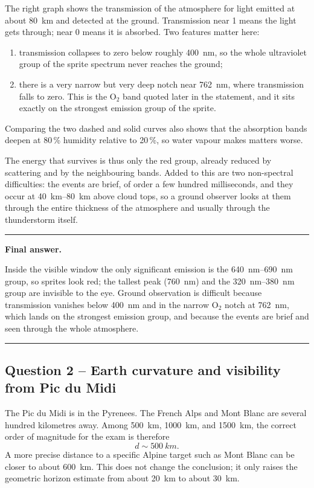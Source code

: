 \documentclass[11pt,a4paper]{article}
\newenvironment{finalanswer}{%
  \begin{center}\begin{minipage}{0.94\linewidth}\hrule\vspace{0.45em}\textbf{Final answer. }%
}{%
  \vspace{0.45em}\hrule\end{minipage}\end{center}%
}
\newcommand{\Otwo}{\ensuremath{\mathrm{O}_2}}
\begin{document}
The right graph shows the transmission of the atmosphere for light emitted at
about \SI{80}{km} and detected at the ground. Transmission near 1 means the light
gets through; near 0 means it is absorbed. Two features matter here:
\begin{enumerate}[label=\arabic*)]
\item transmission collapses to zero below roughly \SI{400}{nm}, so the whole
ultraviolet group of the sprite spectrum never reaches the ground;
\item there is a very narrow but very deep notch near \SI{762}{nm}, where
transmission falls to zero. This is the \Otwo{} band quoted later in the
statement, and it sits exactly on the strongest emission group of the sprite.
\end{enumerate}
Comparing the two dashed and solid curves also shows that the absorption bands
deepen at 80\,\% humidity relative to 20\,\%, so water vapour makes matters
worse.

The energy that survives is thus only the red group, already reduced by
scattering and by the neighbouring bands. Added to this are two non-spectral
difficulties: the events are brief, of order a few hundred milliseconds, and
they occur at \SIrange{40}{80}{km} above cloud tops, so a ground observer looks
at them through the entire thickness of the atmosphere and usually through the
thunderstorm itself.

\begin{finalanswer}
Inside the visible window the only significant emission is the \SIrange{640}{690}{nm} group, so sprites look red; the tallest peak (\SI{760}{nm}) and the \SIrange{320}{380}{nm} group are invisible to the eye. Ground observation is difficult because transmission vanishes below \SI{400}{nm} and in the narrow \Otwo{} notch at \SI{762}{nm}, which lands on the strongest emission group, and because the events are brief and seen through the whole atmosphere.
\end{finalanswer}

\subsection*{Question 2 -- Earth curvature and visibility from Pic du Midi}

The Pic du Midi is in the Pyrenees. The French Alps and Mont Blanc are several hundred kilometres away. Among \SI{500}{km}, \SI{1000}{km}, and \SI{1500}{km}, the correct order of magnitude for the exam is therefore
\[
 d\sim\SI{500}{km}.
\]
A more precise distance to a specific Alpine target such as Mont Blanc can be closer to about \SI{600}{km}. This does not change the conclusion; it only raises the geometric horizon estimate from about \SI{20}{km} to about \SI{30}{km}.
\end{document}
